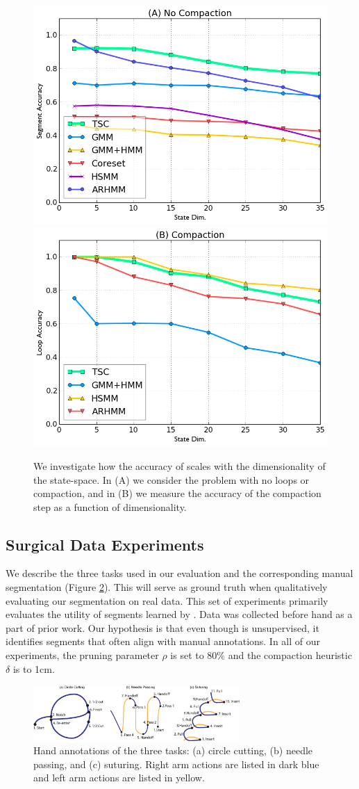 \begin{figure}[ht!]
\centering
\includegraphics[width=0.48\columnwidth]{tsc-experiments/exp11.png}
\includegraphics[width=0.48\columnwidth]{tsc-experiments/exp12.png}
\caption{We investigate how the accuracy of \tsc scales with the dimensionality of the state-space. In (A) we consider the problem with no loops or compaction, and in  (B) we measure the accuracy of the compaction step as a function of dimensionality. \label{exps}}
\end{figure}


\subsection{Surgical Data Experiments}
We describe the three tasks used in our evaluation and the corresponding manual segmentation (Figure \ref{demo}).
This will serve as ground truth when qualitatively evaluating our segmentation on real data.
This set of experiments primarily evaluates the utility of segments learned by \tsc.
Data was collected before hand as a part of prior work.
Our hypothesis is that even though \tsc is unsupervised, it identifies segments that often align with manual annotations.
In all of our experiments, the pruning parameter $\rho$ is set to $80\%$ and the compaction heuristic $\delta$ is to 1cm.

\begin{figure}[ht!]
\centering
\includegraphics[width=0.7\textwidth]{tsc-experiments/conceptual_plots}
 \caption{Hand annotations of the three tasks: (a) circle cutting, (b) needle passing, and (c) suturing. Right arm actions are listed in dark blue and left arm actions are listed in yellow. \label{demo}}
\end{figure}


